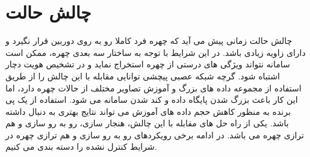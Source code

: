 \section{چالش حالت}
چالش حالت زمانی پیش می آید که چهره فرد کاملا رو به روی دوربین قرار نگیرد و دارای زاویه زیادی باشد. در این شرایط با توجه به ساختار سه بعدی چهره، ممکن است سامانه نتواند ویژگی های درستی از چهره استخراج نماید و در تشخیص هویت دچار اشتباه شود. گرچه شبکه عصبی پیچشی توانایی مقابله با این چالش را از طریق استفاده از مجموعه داده های بزرگ و آموزش تصاویر مختلف از حالات چهره دارد، اما این کار باعث بزرگ شدن پایگاه داده و کند شدن سامانه می شود. استفاده از یک پی برنده  به منظور کاهش حجم داده های آموزش می تواند نتایج بهتری به دنبال داشته باشد. یکی از راه  حل های مقابله با این چالش، هنجار سازی، رو به رو سازی  و هم ترازی  چهره می باشد. در ادامه برخی رویکردهای رو به رو سازی و هم ترازی چهره در شرایط کنترل نشده را دسته بندی می کنیم.

